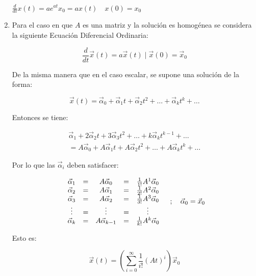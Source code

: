 \begin{enumerate}
\begin{math}
\frac{d}{dt} x(t) = a e^{at} x_0 = a x(t) \quad x(0) = x_0
\end{math}

\item
Para el caso en que $A$ es una matriz y la solución es homogénea se considera la siguiente Ecuación Diferencial Ordinaria:

\begin{equation}
\frac{d}{dt} \vec{x}(t) = a \vec{x}(t) \mid \vec{x}(0) = \vec{x}_0
\end{equation}

De la misma manera que en el caso escalar, se supone una solución de la forma:

\begin{equation}
\vec{x}(t) = \vec{\alpha}_0 + \vec{\alpha}_1 t + \vec{\alpha}_2 t^2 + \dots + \vec{\alpha}_k t^k + \dots
\end{equation}

Entonces se tiene:

\begin{multline}
\vec{\alpha}_1 + 2 \vec{\alpha}_2 t + 3 \vec{\alpha}_3 t^2 + \dots + k \vec{\alpha}_k t^{k-1} + \dots \\ = A \vec{\alpha}_0 + A \vec{\alpha}_1 t + A \vec{\alpha}_2 t^2 + \dots + A \vec{\alpha}_k t^k + \dots \nonumber
\end{multline}

Por lo que las $\vec{\alpha}_i$ deben satisfacer:

\begin{equation}
\begin{array}{c c c c c}
\vec{\alpha}_1 & = & A \vec{\alpha}_0     & = & \frac{1}{1!} A^1 \vec{\alpha}_0 \\
\vec{\alpha}_2 & = & A \vec{\alpha}_1     & = & \frac{1}{2!} A^2 \vec{\alpha}_0 \\
\vec{\alpha}_3 & = & A \vec{\alpha}_2     & = & \frac{1}{3!} A^3 \vec{\alpha}_0 \\
\vdots   & = & \vdots         & = & \vdots                    \\
\vec{\alpha}_k & = & A \vec{\alpha}_{k-1} & = & \frac{1}{k!} A^k \vec{\alpha}_0 \\
\end{array} \quad ; \quad \vec{\alpha}_0 = \vec{x}_0
\end{equation}

Esto es:

\begin{equation}
\vec{x}(t) = \left( \sum\limits_{i = 0}^{\infty} \frac{1}{i!} (A t)^i \right) \vec{x}_0 \nonumber
\end{equation}


\end{enumerate}
